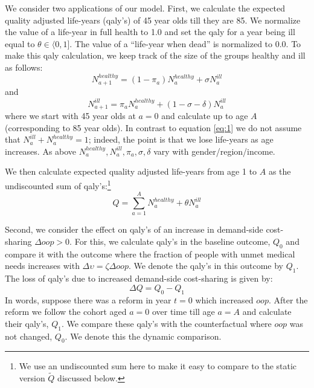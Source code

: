 \documentclass[a4paper,12pt]{article}
\begin{document}
We consider two applications of our model. First, we calculate the expected quality adjusted life-years (qaly's) of 45 year olds till they are 85. We normalize the value of a life-year in full health to 1.0 and set the qaly for a year being ill equal to \(\theta \in \langle 0, 1]\). The value of a ``life-year when dead'' is normalized to 0.0. To make this qaly calculation, we keep track of the size of the groups healthy and ill as follows:
\begin{equation}
\label{eq:6}
N^{healthy}_{a+1} = (1-\pi_a) N^{healthy}_a + \sigma N^{ill}_{a}
\end{equation}
and
\begin{equation}
\label{eq:7}
N^{ill}_{a+1} = \pi_a N^{healthy}_{a} + (1-\sigma-\delta) N^{ill}_{a}
\end{equation}
where we start with 45 year olds at \(a=0\) and calculate up to age \(A\) (corresponding to 85 year olds). In contrast to equation \eqref{eq:1} we do not assume that \(N^{ill}_a + N^{healthy}_a = 1\); indeed, the point is that we lose life-years as age increases. As above \(N^{healthy}_{a},N^{ill}_{a},\pi_a,\sigma,\delta\) vary with gender/region/income.

We then calculate expected quality adjusted life-years from age 1 to \(A\) as the undiscounted sum of qaly's:\footnote{We use an undiscounted sum here to make it easy to compare to the static version \(\tilde Q\) discussed below.}
\begin{equation}
\label{eq:8}
Q = \sum_{a=1}^{A} N^{healthy}_a + \theta N^{ill}_{a}
\end{equation}

Second, we consider the effect on qaly's of an increase in demand-side cost-sharing \(\Delta oop > 0\). For this, we calculate qaly's in the baseline outcome, \(Q_0\) and compare it with the outcome where the fraction of people with unmet medical needs increases with \(\Delta \upsilon = \zeta \Delta oop\). We denote the qaly's in this outcome by \(Q_1\). The loss of qaly's  due to increased demand-side cost-sharing is given by:
\begin{equation}
\label{eq:9}
\Delta Q = Q_0 - Q_1
\end{equation}
In words, suppose there was a reform in year \(t=0\) which increased \(oop\). After the reform we follow the cohort aged \(a=0\) over time till age \(a=A\) and calculate their qaly's, \(Q_1\). We compare these qaly's with the counterfactual where \(oop\) was not changed, \(Q_0\). We denote this the dynamic comparison.
\end{document}
